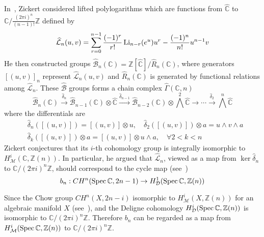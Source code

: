 In~\cite{Zickert_HolomorphicPolylogarithmsAndBlochComplexes}, Zickert considered lifted polylogarithms which are functions from $\widehat{\mathbb C}$ to $\mathbb C/\frac{(2\pi i)^n}{(n-1)!}\mathbb Z$ defined by
\begin{equation}
\widehat{\mathcal L}_n(u,v)=\sum_{r=0}^{n-1}\frac{(-1)^r}{r!}\operatorname{Li}_{n-r}(e^u)u^r-\frac{(-1)^n}{n!}u^{n-1}v
\end{equation}
He then constructed groups $\widehat{\mathcal B}_n(\mathbb C)=\mathbb Z[\widehat{\mathbb C}]/\widehat R_n(\mathbb C)$, where generators $[(u,v)]_n$ represent $\widehat{\mathcal L}_n(u,v)$ and $\widehat R_n(\mathbb C)$ is generated by functional relations among $\widehat{\mathcal L}_n$. These $\widehat{\mathcal B}$ groups forms a chain complex $\widehat\Gamma(\mathbb C,n)$
\begin{equation}\label{eq: lifted Bloch complex for C}
\widehat{\mathcal B}_n(\mathbb C)\xrightarrow{\widehat\delta_n}\widehat{\mathcal B}_{n-1}(\mathbb C)\otimes\widehat{\mathbb C}\xrightarrow{\widehat\delta_{n-1}}\widehat{\mathcal B}_{n-2}(\mathbb C)\otimes\textstyle\bigwedge^2\widehat{\mathbb C}\to\cdots\xrightarrow{\widehat\delta_2}\textstyle\bigwedge^n\widehat{\mathbb C}
\end{equation}
where the differentials are
\begin{equation}\label{eq: differentials for lifted Bloch complex}
\begin{aligned}
&\widehat\delta_n([(u,v)])=[(u,v)]\otimes u,\quad \widehat\delta_2([(u,v)])\otimes a= u\wedge v\wedge a\\
&\widehat\delta_k([(u,v)])\otimes a=[(u,v)]\otimes u\wedge a, \quad\forall 2<k<n
\end{aligned}
\end{equation}
Zickert conjectures that its $i$-th cohomology group is integrally isomorphic to $H^i_{\mathcal M}(\mathbb C,\mathbb Z(n))$. In particular, he argued that $\widehat{\mathcal L}_n$, viewed as a map from $\ker\widehat\delta_n$ to $\mathbb C/(2\pi i)^n\mathbb Z$, should correspond to the cycle map (see~\cite{Bloch_AlgebraicCyclesAndTheBeilinsonConjectures})
\begin{equation}\label{eq: cycle map}
b_n: CH^n(\operatorname{Spec}\mathbb C,2n-1)\to H^1_{\mathcal D}(\operatorname{Spec}\mathbb C,\mathbb Z(n))
\end{equation}

Since the Chow group $CH^n(X,2n-i)$ isomorphic to $H^i_{\mathcal M}(X,\mathbb Z(n))$ for an algebraic manifold $X$ (see~\cite{Voevodsky_MotivicCohomologyGroupsAreIsomorphicToHigherChowGroupsInAnyCharacteristic}), and the Deligne cohomology $H^i_{\mathcal D}(\operatorname{Spec}\mathbb C,\mathbb Z(n))$ is isomorphic to $\mathbb C/(2\pi i)^n\mathbb Z$. Therefore $b_n$ can be regarded as a map from $H^i_{\mathcal M}(\operatorname{Spec}\mathbb C,\mathbb Z(n))$ to $\mathbb C/(2\pi i)^n\mathbb Z$.

